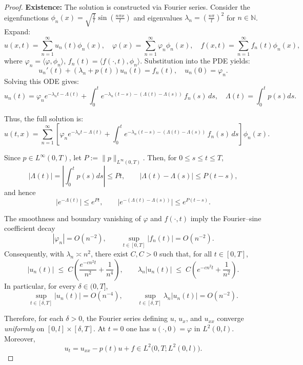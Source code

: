 \documentclass[reqno]{amsart}
\begin{document}
\begin{proof}
\textbf{Existence:} The solution is constructed via Fourier series. Consider the eigenfunctions $\phi_n(x) = \sqrt{\frac{2}{l}} \sin\left(\frac{n\pi x}{l}\right)$ and eigenvalues $\lambda_n = \left(\frac{n\pi}{l}\right)^2$ for $n \in \mathbb{N}$. Expand:
\[
u(x,t) = \sum_{n=1}^{\infty} u_n(t) \phi_n(x), \quad
\varphi(x) = \sum_{n=1}^{\infty} \varphi_n \phi_n(x), \quad
f(x,t) = \sum_{n=1}^{\infty} f_n(t) \phi_n(x),
\]
where $\varphi_n = \langle \varphi, \phi_n \rangle$, $f_n(t) = \langle f(\cdot,t), \phi_n \rangle$. Substitution into the PDE yields:
\[
u_n'(t) + (\lambda_n + p(t))u_n(t) = f_n(t), \quad u_n(0) = \varphi_n.
\]
Solving this ODE gives:
\begin{equation}\label{sol_coeff}
u_n(t) = \varphi_n e^{-\lambda_nt-\Lambda(t)} + \int_{0}^{t} e^{-\lambda_n(t-s)-(\Lambda(t)-\Lambda(s))}\, f_n(s)\, ds, \quad  \Lambda(t) =  \int_0^t p(s)ds.
\end{equation}

Thus, the full solution is:
\begin{equation}\label{full}
u(t,x) =\sum_{n=1
}^{\infty}\left[ \varphi_n e^{-\lambda_nt-\Lambda(t)} + \int_{0}^{t} e^{-\lambda_n(t-s)-(\Lambda(t)-\Lambda(s))}\, f_n(s)\, ds\right]\phi_n(x).
\end{equation}

Since $p\in L^\infty(0,T)$, let $P:=\|p\|_{L^\infty(0,T)}$. Then, for $0\le s\le t\le T$,
\[
|\Lambda(t)| = \left|\int_0^t p(s)ds \right| \le Pt,\qquad |\Lambda(t)-\Lambda(s)|\le P(t-s),
\]
and hence
\[
\big|e^{-\Lambda(t)}\big|\le e^{Pt},\qquad \big|e^{-(\Lambda(t)-\Lambda(s))}\big|\le e^{P(t-s)}.
\]

The smoothness and boundary vanishing of $\varphi$ and $f(\cdot,t)$ imply the Fourier–sine
coefficient decay
\[
|\varphi_n|=O(n^{-2}),\qquad \sup_{t\in[0,T]}|f_n(t)|=O(n^{-2}).
\]
Consequently, with $\lambda_n\asymp n^2$, there exist $C, C>0$ such that, for all $t\in[0,T]$,
\[
|u_n(t)|\;\le\; C\!\left(\frac{e^{-c n^2 t}}{n^{2}}+\frac{1}{n^{4}}\right),
\qquad
\lambda_n|u_n(t)|\;\le\; C\!\left(e^{-c n^2 t}+\frac{1}{n^{2}}\right).
\]
In particular, for every $\delta\in(0,T]$,
\[
\sup_{t\in[\delta,T]}|u_n(t)|=O(n^{-4}),\qquad
\sup_{t\in[\delta,T]}\lambda_n|u_n(t)|=O(n^{-2}).
\]

Therefore, for each $\delta>0$, the Fourier series defining $u$, $u_x$, and $u_{xx}$
converge \emph{uniformly} on $[0,l]\times[\delta,T]$.
At $t=0$ one has $u(\cdot,0)=\varphi$ in $L^2(0,l)$.
Moreover,
\[
u_t=u_{xx}-p(t)u+f\in L^2\!\big(0,T;L^2(0,l)\big).
\]



\end{proof}
\end{document}
